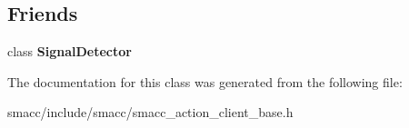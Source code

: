 \subsection*{Friends}
\begin{DoxyCompactItemize}
\item 
\hypertarget{classsmacc_1_1SmaccActionClientBase_a9fb9044f83e768849d1b42d9d0d5508e}{class {\bfseries Signal\-Detector}}\label{classsmacc_1_1SmaccActionClientBase_a9fb9044f83e768849d1b42d9d0d5508e}

\end{DoxyCompactItemize}


The documentation for this class was generated from the following file\-:\begin{DoxyCompactItemize}
\item 
smacc/include/smacc/smacc\-\_\-action\-\_\-client\-\_\-base.\-h\end{DoxyCompactItemize}
